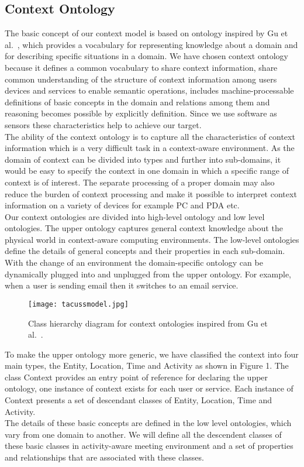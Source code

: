 \documentclass[copyright,creativecommons,noderivs,noncommercial]{eptcs}
\begin{document}
\subsection{Context Ontology}
The basic concept of our context model is based on ontology inspired by Gu et al.~\cite{k12}, which provides a vocabulary for representing knowledge about a domain and for describing specific situations in a domain. We have chosen context ontology because it defines a common vocabulary to share context information, share common understanding of the structure of context information among users devices and services to enable semantic operations, includes machine-processable definitions of basic concepts in the domain and relations among them and reasoning becomes possible by explicitly definition. Since we use software as sensors these characteristics help to achieve our target.\\
The ability of the context ontology is to capture all the characteristics of context information which is a very difficult task in a context-aware environment. As the domain of context can be divided  into  types and further into sub-domains, it would be easy to specify the  context  in  one  domain  in  which  a  specific  range  of context  is  of  interest. The  separate processing of a proper domain  may also reduce  the  burden  of  context  processing  and  make  it possible  to  interpret  context  information  on  a variety of devices for example PC and PDA etc.\\
Our context ontologies are divided into high-level ontology and low level ontologies. The  upper ontology  captures  general context  knowledge  about  the  physical  world  in  context-aware computing  environments.  The  low-level ontologies define  the details of general concepts and  their properties  in each sub-domain. With the change of an environment the domain-specific ontology  can be dynamically  plugged  into  and  unplugged  from  the  upper ontology. For  example, when a user is sending email then it switches to an email service.
\begin{figure}[h]
   \begin{center}
   \texttt{[image: tacussmodel.jpg]}
   \end{center}
  \caption{Class hierarchy diagram for context ontologies inspired from Gu et al.~\cite{k12}.}
  \label{fig1}
\end{figure}
To make the upper ontology more generic, we have classified the context into four main types, the Entity, Location, Time and Activity as shown in Figure 1. The class Context provides an entry point of reference for declaring the upper ontology, one instance of context exists for each user or service. Each instance of Context presents a set of descendant classes of Entity, Location, Time and Activity.\\
The details of these basic concepts are defined in the low level ontologies, which vary from one domain to another. We will define all the descendent classes of these basic classes in activity-aware meeting environment and a set of properties and relationships that are associated with these classes.
\end{document}
